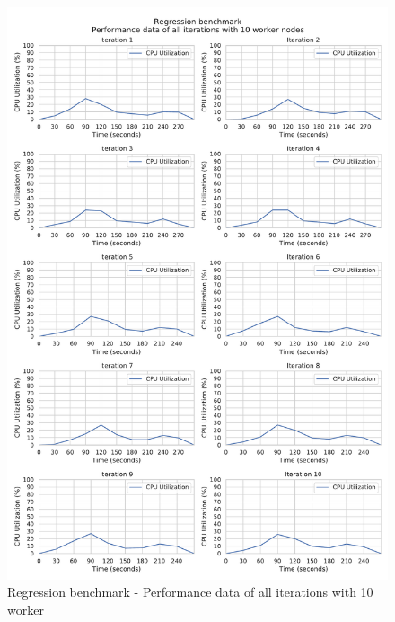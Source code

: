 \begin{figure}[h]
\centering
\includegraphics[scale=0.5]{images/appendix/evaluation_data/regression_benchmark/regression_10_worker_cpu_performance}
\caption{Regression benchmark - Performance data of all iterations with 10 worker}
\label{fig:appendix_eval_regression_static10}
\end{figure}

